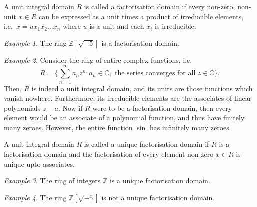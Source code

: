 \documentclass[11pt]{article}
\newcommand{\C}{\mathbb{C}}
\newcommand{\Z}{\mathbb{Z}}
\theoremstyle{definition}
\theoremstyle{remark}
\newtheorem*{example}{Example}
\numberwithin{equation}{section}
\begin{document}
    \begin{definition}
        A unit integral domain $R$ is called a factorisation domain if every
        non-zero, non-unit $x\in R$ can be expressed as a unit times a product of
        irreducible elements, i.e.\ $x = ux_1x_2\dots x_n$ where $u$ is a unit and
        each $x_i$ is irreducible.
    \end{definition}
    \begin{example}
        The ring $\Z[\sqrt{-5}]$ is a factorisation domain.
    \end{example}
    \begin{example}
        Consider the ring of entire complex functions, i.e.\ \[
            R = \{\sum_{n = 1}^\infty a_nz^n: a_n \in \C, \text{ the series converges
            for all } z \in \C\}.
        \] Then, $R$ is indeed a unit integral domain, and its units are those
        functions which vanish nowhere. Furthermore, its irreducible elements are the
        associates of linear polynomials $z - a$. Now if $R$ were to be a
        factorisation domain, then every element would be an associate of a
        polynomial function, and thus have finitely many zeroes. However, the entire
        function $\sin$ has infinitely many zeroes.
    \end{example}


    \begin{definition}
        A unit integral domain $R$ is called a unique factorisation domain if $R$ is
        a factorisation domain and the factorisation of every element non-zero $x \in
        R$ is unique upto associates.
    \end{definition}
    \begin{example}
        The ring of integers $\Z$ is a unique factorisation domain.
    \end{example}
    \begin{example}
        The ring $\Z[\sqrt{-5}]$ is not a unique factorisation domain.
    \end{example}
\end{document}
